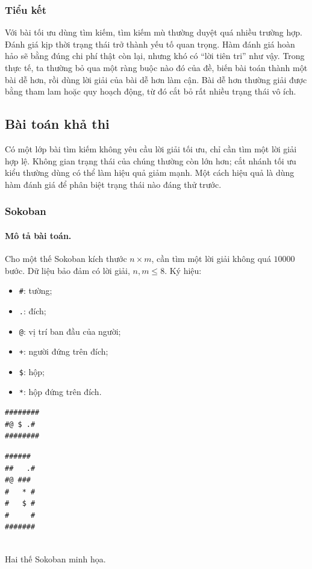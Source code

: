 \documentclass[11pt]{article}
\begin{document}
\subsubsection{Tiểu kết}

Với bài tối ưu dùng tìm kiếm, tìm kiếm mù thường duyệt quá nhiều trường hợp.
Đánh giá kịp thời trạng thái trở thành yếu tố quan trọng. Hàm đánh giá hoàn
hảo sẽ bằng đúng chi phí thật còn lại, nhưng khó có ``lời tiên tri'' như vậy.
Trong thực tế, ta thường bỏ qua một ràng buộc nào đó của đề, biến bài toán
thành một bài dễ hơn, rồi dùng lời giải của bài dễ hơn làm cận. Bài dễ hơn
thường giải được bằng tham lam hoặc quy hoạch động, từ đó cắt bỏ rất nhiều
trạng thái vô ích.

\subsection{Bài toán khả thi}

Có một lớp bài tìm kiếm không yêu cầu lời giải tối ưu, chỉ cần tìm một lời giải
hợp lệ. Không gian trạng thái của chúng thường còn lớn hơn; cắt nhánh tối ưu
kiểu thường dùng có thể làm hiệu quả giảm mạnh. Một cách hiệu quả là dùng hàm
đánh giá để phân biệt trạng thái nào đáng thử trước.

\subsubsection{Sokoban}

\paragraph{Mô tả bài toán.}
Cho một thế Sokoban kích thước \(n\times m\), cần tìm một lời giải không quá
\(10000\) bước. Dữ liệu bảo đảm có lời giải, \(n,m\le8\). Ký hiệu:
\begin{itemize}
  \item \texttt{\#}: tường;
  \item \texttt{.}: đích;
  \item \texttt{@}: vị trí ban đầu của người;
  \item \texttt{+}: người đứng trên đích;
  \item \texttt{\$}: hộp;
  \item \texttt{*}: hộp đứng trên đích.
\end{itemize}

\begin{center}
\begin{minipage}{0.34\linewidth}
\small
\begin{verbatim}
########
#@ $ .#
########
\end{verbatim}
\end{minipage}
\hfill
\begin{minipage}{0.42\linewidth}
\small
\begin{verbatim}
######
##   .#
#@ ###
#   * #
#   $ #
#     #
#######
\end{verbatim}
\end{minipage}\\
\small Hai thế Sokoban minh họa.
\end{center}
\end{document}
